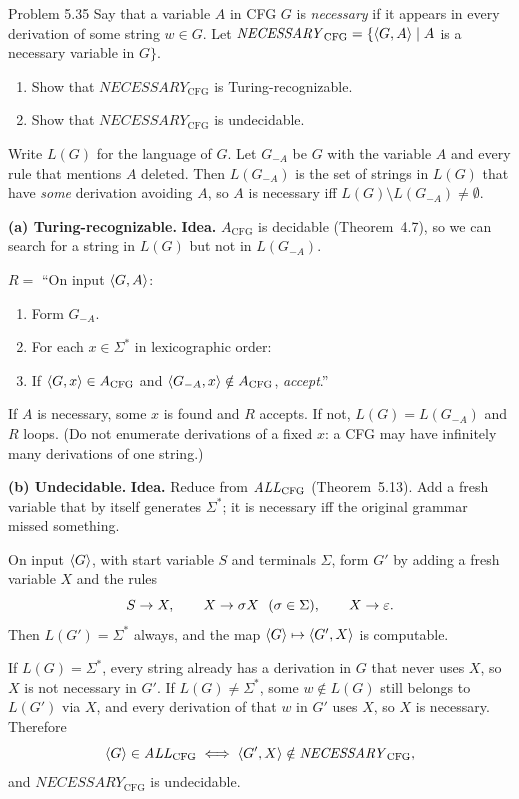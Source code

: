 \begin{question}{Problem 5.35}
Say that a variable $A$ in CFG $G$ is \emph{necessary} if it appears in every derivation of some string $w\in G$. Let
$\mathit{NECESSARY}_{\mathrm{CFG}}=\{\langle G,A\rangle\mid A$ is a necessary variable in $G\}$.
\begin{enumerate}[label=\alph*.]
\item Show that $\mathit{NECESSARY}_{\mathrm{CFG}}$ is Turing-recognizable.
\item Show that $\mathit{NECESSARY}_{\mathrm{CFG}}$ is undecidable.
\end{enumerate}
\end{question}
\begin{soln}
Write $L(G)$ for the language of $G$. Let $G_{-A}$ be $G$ with the variable $A$ and every rule that mentions $A$ deleted. Then $L(G_{-A})$ is the set of strings in $L(G)$ that have \emph{some} derivation avoiding $A$, so $A$ is necessary iff $L(G)\setminus L(G_{-A})\neq\emptyset$.

\textbf{(a) Turing-recognizable.}
\textbf{Idea.} $A_{\mathrm{CFG}}$ is decidable (Theorem~4.7), so we can search for a string in $L(G)$ but not in $L(G_{-A})$.

$R=$ ``On input $\langle G,A\rangle$:
\begin{enumerate}
\item Form $G_{-A}$.
\item For each $x\in\Sigma^*$ in lexicographic order:
\item If $\langle G,x\rangle\in A_{\mathrm{CFG}}$ and $\langle G_{-A},x\rangle\notin A_{\mathrm{CFG}}$, \emph{accept}.''
\end{enumerate}
If $A$ is necessary, some $x$ is found and $R$ accepts. If not, $L(G)=L(G_{-A})$ and $R$ loops. (Do not enumerate derivations of a fixed $x$: a CFG may have infinitely many derivations of one string.)

\textbf{(b) Undecidable.}
\textbf{Idea.} Reduce from $\mathit{ALL}_{\mathrm{CFG}}$ (Theorem~5.13). Add a fresh variable that by itself generates $\Sigma^*$; it is necessary iff the original grammar missed something.

On input $\langle G\rangle$, with start variable $S$ and terminals $\Sigma$, form $G'$ by adding a fresh variable $X$ and the rules
\[
S\to X,\qquad X\to\sigma X\ \ (\sigma\in\Sigma),\qquad X\to\eps.
\]
Then $L(G')=\Sigma^*$ always, and the map $\langle G\rangle\mapsto\langle G',X\rangle$ is computable.

If $L(G)=\Sigma^*$, every string already has a derivation in $G$ that never uses $X$, so $X$ is not necessary in $G'$. If $L(G)\neq\Sigma^*$, some $w\notin L(G)$ still belongs to $L(G')$ via $X$, and every derivation of that $w$ in $G'$ uses $X$, so $X$ is necessary. Therefore
\[
\langle G\rangle\in\mathit{ALL}_{\mathrm{CFG}} \iff \langle G',X\rangle\notin\mathit{NECESSARY}_{\mathrm{CFG}},
\]
and $\mathit{NECESSARY}_{\mathrm{CFG}}$ is undecidable.
\end{soln}


